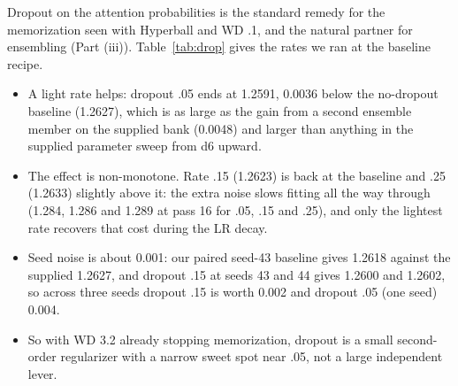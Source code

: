 Dropout on the attention probabilities is the standard remedy for the memorization seen with Hyperball and WD .1, and the natural partner for ensembling (Part (iii)). Table~\ref{tab:drop} gives the rates we ran at the baseline recipe.
\begin{itemize}
\item A light rate helps: dropout .05 ends at 1.2591, 0.0036 below the no-dropout baseline (1.2627), which is as large as the gain from a second ensemble member on the supplied bank (0.0048) and larger than anything in the supplied parameter sweep from d6 upward.
\item The effect is non-monotone. Rate .15 (1.2623) is back at the baseline and .25 (1.2633) slightly above it: the extra noise slows fitting all the way through (1.284, 1.286 and 1.289 at pass 16 for .05, .15 and .25), and only the lightest rate recovers that cost during the LR decay.
\item Seed noise is about 0.001: our paired seed-43 baseline gives 1.2618 against the supplied 1.2627, and dropout .15 at seeds 43 and 44 gives 1.2600 and 1.2602, so across three seeds dropout .15 is worth 0.002 and dropout .05 (one seed) 0.004.
\item So with WD 3.2 already stopping memorization, dropout is a small second-order regularizer with a narrow sweet spot near .05, not a large independent lever.
\end{itemize}
